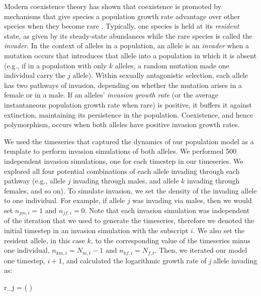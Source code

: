 \documentclass[12pt]{article}
\let\oldequation\equation
\let\oldendequation\endequation
\renewenvironment{equation}
  {\linenomathNonumbers\oldequation}
  {\oldendequation\endlinenomath}
\begin{document}
 Modern coexistence theory has shown that coexistence is promoted by mechanisms that give species a population growth rate advantage over other species when they become rare \citep{chesson_stabilizing_1982, chesson2003quantifying, barabas_chessons_2018}. Typically, one species is held at its \textit{resident} state, as given by its steady-state abundances while the rare species is called the \textit{invader}. In the context of alleles in a population, an allele is an \textit{invader} when a mutation occurs that introduces that allele into a population in which it is absent (e.g., if in a population with only $k$ alleles, a random mutation made one individual carry the $j$ allele). Within sexually antagonistic selection, each allele has two pathways of invasion, depending on whether the mutation arises in a female or in a male. If an alleles' \textit{invasion growth rate} (or the average instantaneous population growth rate when rare) is positive, it buffers it against extinction, maintaining its persistence in the population.  Coexistence, and hence polymorphism, occurs when both alleles have positive invasion growth rates.

We used the timeseries that captured the dynamics of our population model as a template to perform invasion simulations of both alleles. We performed 500 independent invasion simulations, one for each timestep in our timeseries. We explored all four potential combinations of each allele invading through each pathway (e.g., allele $j$ invading through males, and allele $k$ invading through females, and so on). To simulate invasion, we set the density of the invading allele to one individual. For example, if allele $j$ was invading via males, then we would set $n_{jm,i} = 1$ and $n_{jf,i}= 0$. Note that each invasion simulation was independent of the iteration that we used to generate the timeseries, therefore we denoted the initial timestep in an invasion simulation with the subscript $i$. We also set the resident allele, in this case $k$, to the corresponding value of the timeseries minus one individual, $n_{km,i} = N_{m,t} -1$ and $n_{kf,i} = N_{f,t}$. Then, we iterated our model one timestep, $i+1$, and calculated the logarithmic growth rate of \textit{j} allele invading as:


\begin{equation}
r_{j} =	\ln \left (  \right )
\label{invader}
\end{equation}
\end{document}
